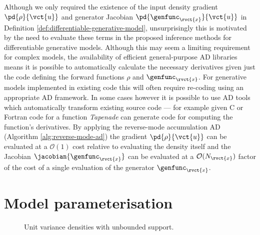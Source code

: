 Although we only required the existence of the input density gradient $\pd{\rho}{\vct{u}}$ and generator Jacobian $\pd{\genfunc_{\rvct{x}}}{\vct{u}}$ in Definition \ref{def:differentiable-generative-model}, unsurprisingly this is motivated by the need to evaluate these terms in the proposed inference methods for differentiable generative models. Although this may seem a limiting requirement for complex models, the availability of efficient general-purpose \ac{AD} libraries \citep{baydin2015automatic} means it is possible to automatically calculate the necessary derivatives given just the code defining the forward functions $\rho$ and $\genfunc_{\rvct{x}}$. For generative models implemented in existing code this will often require re-coding using an appropriate \ac{AD} framework. In some cases however it is possible to use \ac{AD} tools which automatically transform existing source code --- for example given C or Fortran code for a function \emph{Tapenade} \citep{hascoet2013tapenade} can generate code for computing the function's derivatives. By applying the reverse-mode accumulation \ac{AD} (Algorithm \ref{alg:reverse-mode-ad}) the gradient $\pd{\rho}{\vct{u}}$  can be evaluated at a $\mathcal{O}(1)$ cost relative to evaluating the density itself and the Jacobian $\jacobian{\genfunc_{\rvct{x}}}$ can be evaluated at a $\mathcal{O}(N_{\rvct{x}})$ factor of the cost of a single evaluation of the generator $\genfunc_{\rvct{x}}$.


\section{Model parameterisation}\label{sec:model-parameterisation}

\begin{figure}[!t]
\centering
{}
\vspace{-1mm}
\caption[Unbounded unit variance densities.]{Unit variance densities with unbounded support.}
\label{fig:unit-variance-densities}
\end{figure}

